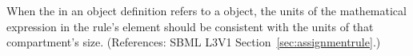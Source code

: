 When the  in an \AssignmentRule object definition refers to
a \Compartment object, the units of the mathematical expression in the
rule's  element should be consistent with the units of that
compartment's size.  (References: SBML L3V1
Section~\ref{sec:assignmentrule}.)
